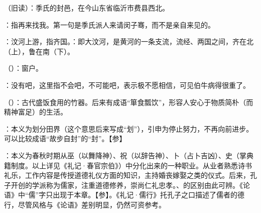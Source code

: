 {
\item {}（旧读）：季氏的封邑，在今山东省临沂市费县西北。%
\item {}：指再来找我。第一句是季氏派人来请闵子骞，而不是亲自来见的。

\item {}：汶河上游，指齐国。：即大汶河，是黄河的一条支流，流经、两国之间，齐在北（上），鲁在南（下）。
}
{}


{
\item {}（）：窗户。
\item {}：没有吧，这里指不会吧，不可能吧，表示极不愿相信，可见伯牛病得很重了。
}
{}


{
\item {}（）：古代盛饭食用的竹器。后来有成语“箪食瓢饮”，形容人安心于物质简朴（而精神富足）的生活。%
}
{}


{
\item {}：本义为划分田界（这个意思后来写成“划”），引申为停止努力，不再向前进步。可以比较成语“故步自封”的“封”。【参】
}
{}  %


{
\item {}：本义为春秋时期从巫（以舞降神）、祝（以辞告神）、卜（占卜吉凶）、史（掌典籍制度。以上详见《礼记·春官宗伯》）中分化出来的一种职业。从业者熟悉诗书礼乐，工作内容是传授道德礼仪方面的知识，主持婚丧嫁娶之类的仪式。后来，孔子开创的学派称为儒家，注重道德修养，崇尚仁礼忠孝。、的区别由此可辨。《论语》中“儒”字只出现于本章。【参】。《礼记·儒行》托孔子之口描述了儒者的德行，尽管风格与《论语》差别明显，仍然可资参考。
}
{}


